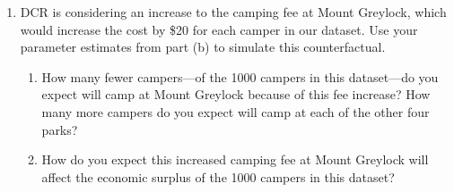 \documentclass[11pt,letterpaper]{article}
\begin{document}
\begin{enumerate}[label=\alph*., leftmargin=*]
	\item DCR is considering an increase to the camping fee at Mount Greylock, which would increase the cost by \$20 for each camper in our dataset. Use your parameter estimates from part (b) to simulate this counterfactual.

	\begin{enumerate}[label=\roman*.]
		\item How many fewer campers---of the 1000 campers in this dataset---do you expect will camp at Mount Greylock because of this fee increase? How many more campers do you expect will camp at each of the other four parks?

		\item How do you expect this increased camping fee at Mount Greylock will affect the economic surplus of the 1000 campers in this dataset?
	\end{enumerate}
\end{enumerate}
\end{document}
